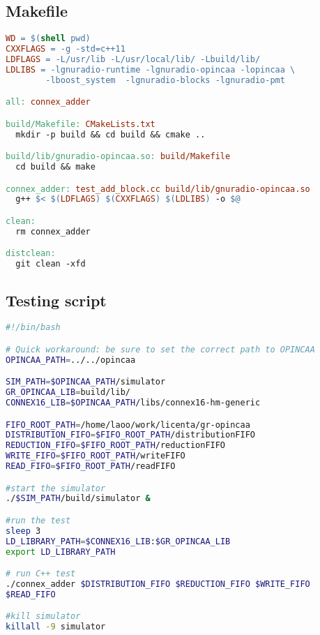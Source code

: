         \begin{minipage}{\linewidth}
        \subsection{Makefile}
        \label{ssec:makefile-test-cpp}
                \begin{lstlisting}[language=make]
WD = $(shell pwd)
CXXFLAGS = -g -std=c++11
LDFLAGS = -L/usr/lib -L/usr/local/lib/ -Lbuild/lib/
LDLIBS = -lgnuradio-runtime -lgnuradio-opincaa -lopincaa \
        -lboost_system  -lgnuradio-blocks -lgnuradio-pmt

all: connex_adder

build/Makefile: CMakeLists.txt
  mkdir -p build && cd build && cmake ..

build/lib/gnuradio-opincaa.so: build/Makefile
  cd build && make

connex_adder: test_add_block.cc build/lib/gnuradio-opincaa.so
  g++ $< $(LDFLAGS) $(CXXFLAGS) $(LDLIBS) -o $@

clean:
  rm connex_adder

distclean:
  git clean -xfd
                \end{lstlisting}
                \end{minipage}


        \begin{minipage}{\linewidth}
        \subsection{Testing script}
        \label{ssec:script-test-cpp}
                \begin{lstlisting}[language=bash]
#!/bin/bash

# Quick workaround: be sure to set the correct path to OPINCAA
OPINCAA_PATH=../../opincaa

SIM_PATH=$OPINCAA_PATH/simulator
GR_OPINCAA_LIB=build/lib/
CONNEX16_LIB=$OPINCAA_PATH/libs/connex16-hm-generic

FIFO_ROOT_PATH=/home/laoo/work/licenta/gr-opincaa
DISTRIBUTION_FIFO=$FIFO_ROOT_PATH/distributionFIFO
REDUCTION_FIFO=$FIFO_ROOT_PATH/reductionFIFO
WRITE_FIFO=$FIFO_ROOT_PATH/writeFIFO
READ_FIFO=$FIFO_ROOT_PATH/readFIFO

#start the simulator
./$SIM_PATH/build/simulator &

#run the test
sleep 3
LD_LIBRARY_PATH=$CONNEX16_LIB:$GR_OPINCAA_LIB
export LD_LIBRARY_PATH

# run C++ test
./connex_adder $DISTRIBUTION_FIFO $REDUCTION_FIFO $WRITE_FIFO
$READ_FIFO

#kill simulator
killall -9 simulator
                \end{lstlisting}
                \end{minipage}


